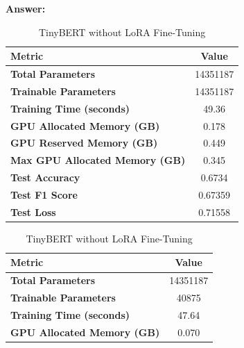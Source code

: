 \documentclass[11pt, oneside]{article}   	%
\begin{document}
\textbf{Answer:} \\

\begin{table}[h!]
    \centering
    \begin{minipage}{0.45\textwidth}
        \centering
        \scriptsize %
        \begin{tabular}{|l|c|}
        \hline
        \textbf{Metric}                            & \textbf{Value}      \\ \hline
        \textbf{Total Parameters}                  & 14351187    \\ \hline
        \textbf{Trainable Parameters}              & 14351187    \\ \hline
        \textbf{Training Time (seconds)}           & 49.36              \\ \hline
        \textbf{GPU Allocated Memory (GB)}         & 0.178              \\ \hline
        \textbf{GPU Reserved Memory (GB)}          & 0.449              \\ \hline
        \textbf{Max GPU Allocated Memory (GB)}     & 0.345              \\ \hline
        \textbf{Test Accuracy}                     & 0.6734             \\ \hline
        \textbf{Test F1 Score}                     & 0.67359            \\ \hline
        \textbf{Test Loss}                         & 0.71558            \\ \hline
        \end{tabular}
        \caption{TinyBERT without LoRA Fine-Tuning}
    \end{minipage}%
    \hfill
    \begin{minipage}{0.45\textwidth}
        \centering
        \scriptsize %
        \begin{tabular}{|l|c|}
        \hline
        \textbf{Metric}                            & \textbf{Value}      \\ \hline
        \textbf{Total Parameters}                  & 14351187    \\ \hline
        \textbf{Trainable Parameters}              & 40875    \\ \hline
        \textbf{Training Time (seconds)}           & 47.64              \\ \hline
        \textbf{GPU Allocated Memory (GB)}         & 0.070              \\ \hline

\end{tabular}
\end{minipage}
\end{table}
\end{document}
